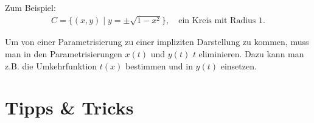 \documentclass[12pt]{article}
\newenvironment{definition}[2][Definition]{\begin{trivlist}
        \item[\hskip \labelsep {\bfseries #1}\hskip \labelsep {\bfseries #2.}]}{\flushright{$\square$}\end{trivlist}}
\newenvironment{remark}[2][Bemerkung]{\begin{trivlist}
        \item[\hskip \labelsep {\bfseries #1}\hskip \labelsep {\bfseries #2.}]}{\end{trivlist}}
\begin{document}
\begin{definition}{[Ebene Kurven]}
\begin{enumerate}
                Zum Beispiel:
                \begin{align*}
                        C=\{(x,y)\mid y=\pm\sqrt{1-x^2}\}, \quad \text{ein Kreis mit Radius 1.}
                \end{align*}
                \begin{figure}[hbt!]
                        \centering
                        \begin{subfigure}[][][]{0.45\textwidth}
                                \centering
                        \end{subfigure}
                        \begin{subfigure}[][][]{0.45\textwidth}
                                \centering
                        \end{subfigure}
                \end{figure}
        \end{enumerate}
        \begin{remark}{[Von Parametrisierung zu impliziten Darstellung]}
                Um von einer Parametrisierung zu einer impliziten Darstellung zu kommen, muss man in den Parametrisierungen $x(t)$ und $y(t)$ $t$ eliminieren. Dazu kann man z.B. die Umkehrfunktion $t(x)$ bestimmen und in $y(t)$ einsetzen.         
        \end{remark}
\end{definition}

\section{Tipps \& Tricks}
\end{document}
